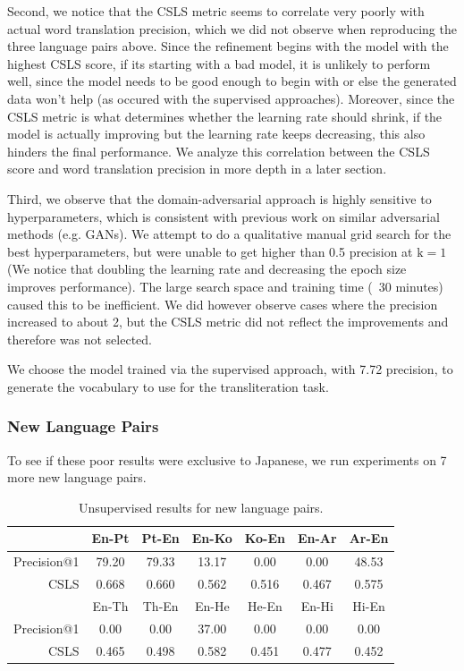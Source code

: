 \documentclass{article}
\begin{document}
Second, we notice that the CSLS metric seems to correlate very poorly
with actual word translation precision, which we did not observe when reproducing
the three language pairs above. Since the refinement begins with the model with
the highest CSLS score, if its starting with a bad model, it is unlikely to
perform well, since the model needs to be good enough to begin with or else the
generated data won't help (as occured with the supervised approaches). Moreover,
since the CSLS metric is what determines whether the learning rate should shrink,
if the model is actually improving but the learning rate keeps decreasing, this
also hinders the final performance. We analyze this correlation between the CSLS
score and word translation precision in more depth in a later section.

Third, we observe that the domain-adversarial approach is highly sensitive to
hyperparameters, which is consistent with previous work on similar adversarial
methods (e.g. GANs). We attempt to do a qualitative manual grid search for
the best hyperparameters, but were unable to get higher than 0.5 precision at
$\text{k}=1$ (We notice that doubling the learning rate and decreasing the epoch
size improves performance). The large search space and training time (~30 minutes)
caused this to be inefficient. We did however observe cases where the precision
increased to about 2, but the CSLS metric did not reflect the improvements and
therefore was not selected.

We choose the model trained via the supervised approach, with 7.72 precision, to
generate the vocabulary to use for the transliteration task.

\subsubsection*{New Language Pairs}

To see if these poor results were exclusive to Japanese, we run experiments
on 7 more new language pairs.

\begin{table}[h]
  \centering
  \begin{tabular}{r|cc|cc|cc}
    \toprule
    & En-Pt & Pt-En & En-Ko & Ko-En & En-Ar & Ar-En \\
    \midrule
    Precision@1 & 79.20 & 79.33 & 13.17 &  0.00 &  0.00 & 48.53 \\
    CSLS        & 0.668 & 0.660 & 0.562 & 0.516 & 0.467 & 0.575 \\
    \midrule
    \midrule
    & En-Th & Th-En & En-He & He-En & En-Hi & Hi-En \\
    \midrule
    Precision@1 &  0.00 &  0.00 & 37.00 &  0.00 &  0.00 &  0.00 \\
    CSLS        & 0.465 & 0.498 & 0.582 & 0.451 & 0.477 & 0.452 \\
    \bottomrule
  \end{tabular}
  \caption{Unsupervised results for new language pairs.}
\end{table}
\end{document}
